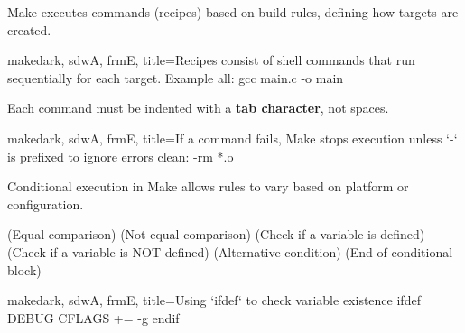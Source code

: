 \begin{NxSSSSBox}
	\begin{NxIDBox}
		Make executes commands (recipes) based on build rules, defining how targets are created.
	\end{NxIDBox}
\end{NxSSSSBox}

\begin{NxCodeBox}{make}{dark, sdwA, frmE, title={Recipes consist of shell commands that run sequentially for each target. Example}}
	all:
		gcc main.c -o main
\end{NxCodeBox}

\bigskip

\begin{NxSSSSBox}[breakable]
	\begin{NxIDBox}
		Each command must be indented with a \textbf{tab character}, not spaces.
	\end{NxIDBox}
\end{NxSSSSBox}

\begin{NxCodeBox}{make}{dark, sdwA, frmE, title={If a command fails, Make stops execution unless `-` is prefixed to ignore errors}}
	clean:
		-rm *.o
\end{NxCodeBox}

\bigskip

\begin{NxSSSSBox}
	\begin{NxIDBox}
		Conditional execution in Make allows rules to vary based on platform or configuration.
		\begin{NxListDark}
			 (Equal comparison)
			 (Not equal comparison)
			 (Check if a variable is defined)
			 (Check if a variable is NOT defined)
			 (Alternative condition)
			 (End of conditional block)
		\end{NxListDark}
	\end{NxIDBox}
\end{NxSSSSBox}

\begin{NxCodeBox}{make}{dark, sdwA, frmE, title={Using `ifdef` to check variable existence}}
	ifdef DEBUG
		CFLAGS += -g
	endif
\end{NxCodeBox}

\bigskip



